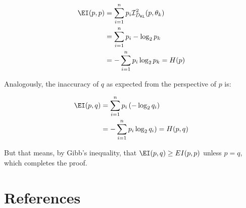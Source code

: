 \documentclass[
  10pt,
  dvipsnames,enabledeprecatedfontcommands]{scrartcl}
\newcommand{\dkl}{D_{\mathsf{KL}}} %
\begin{document}
\begin{align*}
\EI(p,p) & = \sum_{i =1}^n p_i \mathcal{I}_{\dkl}^2(p, \theta_k) \\
& = \sum_{i =1}^n  p_i - \log_2 p_k \\
& = - \sum_{i =1}^n  p_i  \log_2 p_k = H(p)
\end{align*}

\noindent Analogously, the inaccuracy of \(q\) as expected from the
perspective of \(p\) is:

\begin{align*}
\EI(p, q) & =   \sum_{i =1}^n p_i \left( - \log_2 q_i\right)\\
& = -  \sum_{i =1}^n p_i  \log_2 q_i) = H(p,q)
\end{align*}

But that means, by Gibb's inequality, that \(\EI(p,q) \geq EI(p,p)\)
unless \(p=q\), which completes the proof.

\hypertarget{references}{%
\section*{References}\label{references}}
\end{document}
